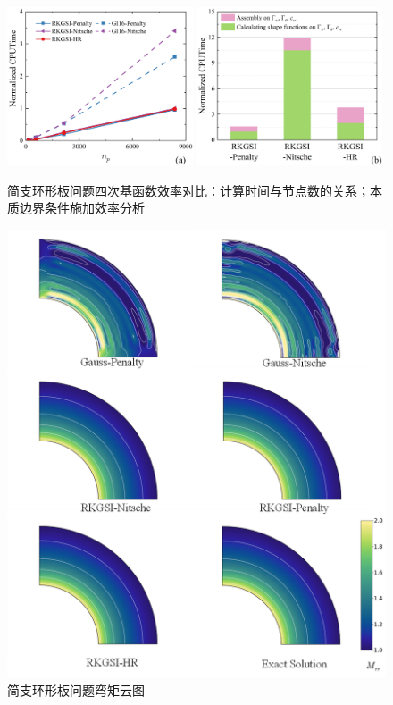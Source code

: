 \newpage
\begin{figure}[H]
    \centering
    \begin{subcaptiongroup}
    \includegraphics[width=0.49\textwidth]{figure/PHR/A/Qcputime.png}
    \label{Qcputime}
    \includegraphics[width=0.49\textwidth]{figure/PHR/A/Qefficiency.png}
    \label{Qefficiency}
    \end{subcaptiongroup}
\caption{简支环形板问题四次基函数效率对比：计算时间与节点数的关系；本质边界条件施加效率分析}
\label{AQcputime}
\end{figure}
\begin{figure}[H]
    \centering
    \includegraphics[scale=0.7]{figure/PHR/A/Mxy.png}
    \caption{简支环形板问题弯矩云图}\label{AMxy}
\end{figure}

